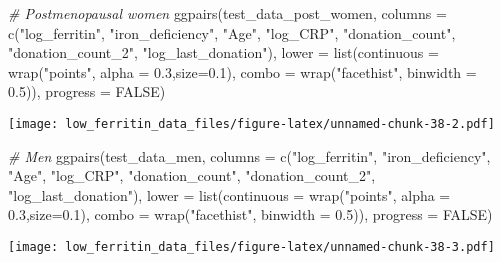 \documentclass[
]{article}
\newenvironment{Shaded}{\begin{snugshade}}{\end{snugshade}}
\newcommand{\AttributeTok}[1]{\textcolor[rgb]{0.77,0.63,0.00}{#1}}
\newcommand{\CommentTok}[1]{\textcolor[rgb]{0.56,0.35,0.01}{\textit{#1}}}
\newcommand{\ConstantTok}[1]{\textcolor[rgb]{0.00,0.00,0.00}{#1}}
\newcommand{\FloatTok}[1]{\textcolor[rgb]{0.00,0.00,0.81}{#1}}
\newcommand{\FunctionTok}[1]{\textcolor[rgb]{0.00,0.00,0.00}{#1}}
\newcommand{\NormalTok}[1]{#1}
\newcommand{\StringTok}[1]{\textcolor[rgb]{0.31,0.60,0.02}{#1}}
\begin{document}
\begin{Shaded}
\begin{Highlighting}[]
\CommentTok{\# Postmenopausal women}
\FunctionTok{ggpairs}\NormalTok{(test\_data\_post\_women, }
        \AttributeTok{columns =} \FunctionTok{c}\NormalTok{(}\StringTok{"log\_ferritin"}\NormalTok{, }\StringTok{"iron\_deficiency"}\NormalTok{, }\StringTok{"Age"}\NormalTok{, }\StringTok{"log\_CRP"}\NormalTok{,  }\StringTok{"donation\_count"}\NormalTok{, }\StringTok{"donation\_count\_2"}\NormalTok{,}
                    \StringTok{"log\_last\_donation"}\NormalTok{),}
         \AttributeTok{lower =} \FunctionTok{list}\NormalTok{(}\AttributeTok{continuous =} \FunctionTok{wrap}\NormalTok{(}\StringTok{"points"}\NormalTok{, }\AttributeTok{alpha =} \FloatTok{0.3}\NormalTok{,}\AttributeTok{size=}\FloatTok{0.1}\NormalTok{),}
                      \AttributeTok{combo =} \FunctionTok{wrap}\NormalTok{(}\StringTok{"facethist"}\NormalTok{, }\AttributeTok{binwidth =} \FloatTok{0.5}\NormalTok{)),}
        \AttributeTok{progress =} \ConstantTok{FALSE}\NormalTok{)}
\end{Highlighting}
\end{Shaded}

\texttt{[image: low\_ferritin\_data\_files/figure-latex/unnamed-chunk-38-2.pdf]}

\begin{Shaded}
\begin{Highlighting}[]
\CommentTok{\# Men}
\FunctionTok{ggpairs}\NormalTok{(test\_data\_men, }
        \AttributeTok{columns =} \FunctionTok{c}\NormalTok{(}\StringTok{"log\_ferritin"}\NormalTok{, }\StringTok{"iron\_deficiency"}\NormalTok{, }\StringTok{"Age"}\NormalTok{, }\StringTok{"log\_CRP"}\NormalTok{,  }\StringTok{"donation\_count"}\NormalTok{, }\StringTok{"donation\_count\_2"}\NormalTok{,}
                    \StringTok{"log\_last\_donation"}\NormalTok{),}
         \AttributeTok{lower =} \FunctionTok{list}\NormalTok{(}\AttributeTok{continuous =} \FunctionTok{wrap}\NormalTok{(}\StringTok{"points"}\NormalTok{, }\AttributeTok{alpha =} \FloatTok{0.3}\NormalTok{,}\AttributeTok{size=}\FloatTok{0.1}\NormalTok{),}
                      \AttributeTok{combo =} \FunctionTok{wrap}\NormalTok{(}\StringTok{"facethist"}\NormalTok{, }\AttributeTok{binwidth =} \FloatTok{0.5}\NormalTok{)),}
        \AttributeTok{progress =} \ConstantTok{FALSE}\NormalTok{)}
\end{Highlighting}
\end{Shaded}

\texttt{[image: low\_ferritin\_data\_files/figure-latex/unnamed-chunk-38-3.pdf]}
\end{document}
